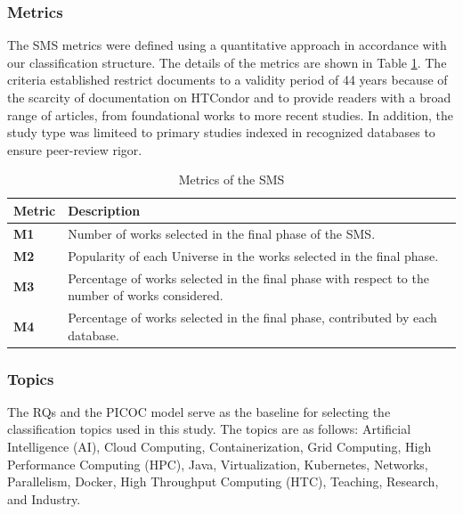 \subsubsection{Metrics}
The SMS metrics were defined using a quantitative approach in accordance with our classification structure. The details of the metrics are shown in Table \ref{table:Metrics}. The criteria established restrict documents to a validity period of 44 years because of the scarcity of documentation on HTCondor and to provide readers with a broad range of articles, from foundational works to more recent studies. In addition, the study type was limiteed to primary studies indexed in recognized databases to ensure peer-review rigor.

\begin{table}[htbp]
	\centering
	\caption{Metrics of the SMS}
	\label{table:Metrics}
	\renewcommand{\arraystretch}{1}  %
	\begin{tabular}{p{1cm}p{6.8cm}}
		\toprule
		\textbf{Metric} & \textbf{Description}                                                                            \\
		\midrule
		\textbf{M1}     & Number of works selected in the final phase of the SMS.                                         \\
		\addlinespace[0.8em]
		\textbf{M2}     & Popularity of each Universe in the works selected in the final phase.                           \\
		\addlinespace[0.8em]
		\textbf{M3}     & Percentage of works selected in the final phase with respect to the number of works considered. \\
		\addlinespace[0.8em]
		\textbf{M4}     & Percentage of works selected in the final phase, contributed by each database.                  \\
		\bottomrule
	\end{tabular}
\end{table}

\subsubsection{Topics}
The RQs and the PICOC model serve as the baseline for selecting the classification topics used in this study. The topics are as follows: Artificial Intelligence (AI), Cloud Computing, Containerization, Grid Computing, High Performance Computing (HPC), Java, Virtualization, Kubernetes, Networks, Parallelism, Docker, High Throughput Computing (HTC), Teaching, Research, and Industry.


